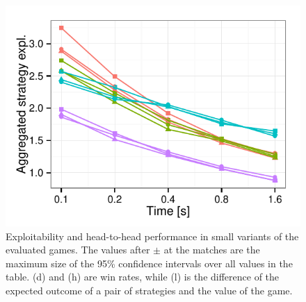 \documentclass{aamas2015}
\begin{document}
\begin{figure}[t]
{\begin{minipage}{0.235\textwidth}
\includegraphics[width=\textwidth]{fig/agg_OSS-IST-WC_convergence-GP_2_2_3_3}
\end{minipage}}

\caption{Exploitability and head-to-head performance in small variants of the evaluated games. The values after $\pm$ at the matches are the maximum size of the 95\% confidence intervals over all values in the table. (d) and (h) are win rates, while (l) is the difference of the  expected outcome of a pair of strategies and the value of the game.}\label{fig:small}
\end{figure}
\end{document}
